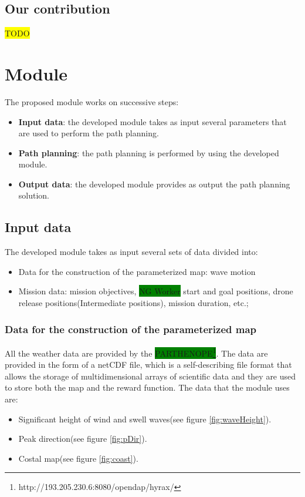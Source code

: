 \documentclass[journal,article,submit,pdftex,moreauthors]{Definitions/mdpi}
\begin{document}
\subsection{Our contribution}
\colorbox{yellow}{TODO}


\section{Module}
The proposed module works on successive steps:
\begin{itemize}[labelsep=2.5mm,topsep=-3pt]
	\item \textbf{Input data}: the developed module takes as input several parameters that are used to perform the path planning. 
	\item \textbf{Path planning}: the path planning is performed by using the developed module. 
	\item \textbf{Output data}: the developed module provides as output the path planning solution.
\end{itemize}

\subsection{Input data}
The developed module takes as input several sets of data divided into:
\begin{itemize}
\item Data for the construction of the parameterized map: wave motion 
\item Mission data: mission objectives, \colorbox{green}{NG Worker} start and goal positions, drone release positions(Intermediate positions), 
	mission duration, etc.;
\end{itemize}

\subsubsection{Data for the construction of the parameterized map}

All the weather data are provided by the \colorbox{green}{PARTHENOPE\footnote[2]{http://193.205.230.6:8080/opendap/hyrax/}}. The data are provided in the form of a netCDF file,
which is a self-describing file format that allows the storage of multidimensional arrays of scientific data and they are used to store both the map and the reward function.
The data that the module uses are:
\begin{itemize}
\item Significant height of wind and swell waves(see figure \ref*{fig:waveHeight}).
\item Peak direction(see figure \ref*{fig:pDir}).
\item Costal map(see figure \ref*{fig:coast}).
\end{itemize}
\end{document}
